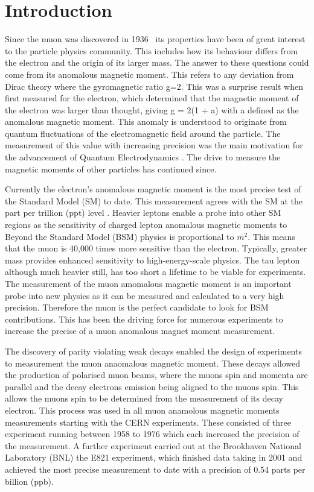 
\chapter{Introduction} %

\label{Introduction} %

Since the muon was discovered in 1936~\cite{cloudchamber} its properties have been of great interest to the particle physics community. This includes how its behaviour differs from the electron and the origin of its larger mass. The answer to these questions could come from its anomalous magnetic moment. This refers to any deviation from Dirac theory where the gyromagnetic ratio g=2. This was a surprise result when first measured for the electron, which determined that the magnetic moment of the electron was larger than thought, giving g = 2(1 + a) with a defined as the anomalous magnetic moment. This anomaly is understood to originate from quantum fluctuations of the electromagnetic field around the particle. The measurement of this value with increasing precision was the main motivation for the advancement of Quantum Electrodynamics \cite{Reference10}. The drive to measure the magnetic moments of other particles has continued since. 

Currently the electron's anomalous magnetic moment is the most precise test of the Standard Model (SM) to date. This measurement agrees with the SM at the part per trillion (ppt) level \cite{electronmagmom}. Heavier leptons enable a probe into other SM regions as the sensitivity of charged lepton anomalous magnetic moments to Beyond the Standard Model (BSM) physics is proportional to $m^2$. This means that the muon is 40,000 times more sensitive than the electron. Typically, greater mass provides enhanced sensitivity to high-energy-scale physics. The tau lepton although much heavier still, has too short a lifetime to be viable for experiments. The measurement of the muon amomalous magnetic moment is an important probe into new physics as it can be measured and calculated to a very high precision. Therefore the muon is the perfect candidate to look for BSM contributions. This has been the driving force for numerous experiments to increase the precise of a muon anomalous magnet moment measurement. 

The discovery of parity violating weak decays enabled the design of experiments to measurement the muon anaomalous magnetic moment. These decays allowed the production of polarised muon beams, where the muons spin and momenta are parallel and the decay electrons emission being aligned to the muons spin. This allows the muons spin to be determined from the measurement of its decay electron. This process was used in all muon anamolous magnetic moments measurements starting with the CERN experiments. These consisted of three experiment running between 1958 to 1976 which each increased the precision of the measurement. A further experiment carried out at the Brookhaven National Laboratory (BNL) the E821 experiment, which finished data taking in 2001 and achieved the most precise measurement to date with a precision of 0.54 parts per billion (ppb). 


